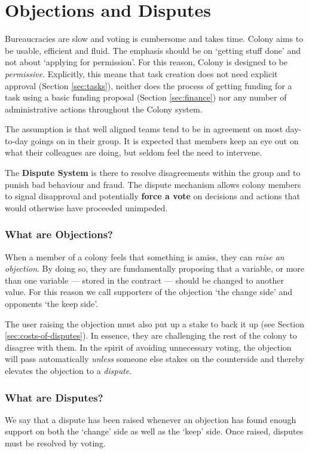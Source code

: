 \section{Objections and Disputes}\label{sec:objections-and-disputes}\label{sec:disputes}
Bureaucracies are slow and voting is cumbersome and takes time. Colony aims to be usable, efficient and fluid. The emphasis should be on `getting stuff done' and not about `applying for permission'. For this reason, Colony is designed to be \emph{permissive}. Explicitly, this means that task creation does not need explicit approval (Section \ref{sec:tasks}), neither does the process of getting funding for a task using a basic funding proposal (Section \ref{sec:finance}) nor any number of administrative actions throughout the Colony system.

The assumption is that well aligned teams tend to be in agreement on most day-to-day goings on in their group. It is expected that members keep an eye out on what their colleagues are doing, but seldom feel the need to intervene. 

The \textbf{Dispute System} is there to resolve disagreements within the group and to punish bad behaviour and fraud. The dispute mechanism allows colony members to signal disapproval and potentially \textbf{force a vote} on decisions and actions that would otherwise have proceeded unimpeded.


\subsubsection*{What are Objections?}
When a member of a colony feels that something is amiss, they can \emph{raise an objection}. By doing so, they are fundamentally proposing that a variable, or more than one variable --- stored in the  contract --- should be changed to another value. For this reason we call supporters of the objection `the change side' and opponents `the keep side'.

The user raising the objection must also put up a stake to back it up (see Section \ref{sec:costs-of-disputes}). In essence, they are challenging the rest of the colony to disagree with them. In the spirit of avoiding unnecessary voting, the objection will pass automatically \emph{unless} someone else stakes on the counterside and thereby elevates the objection to a \emph{dispute}.

\subsubsection*{What are Disputes?}
We say that a dispute has been raised whenever an objection has found enough support on both the `change' side as well as the `keep' side. Once raised, disputes must be resolved by voting. 

